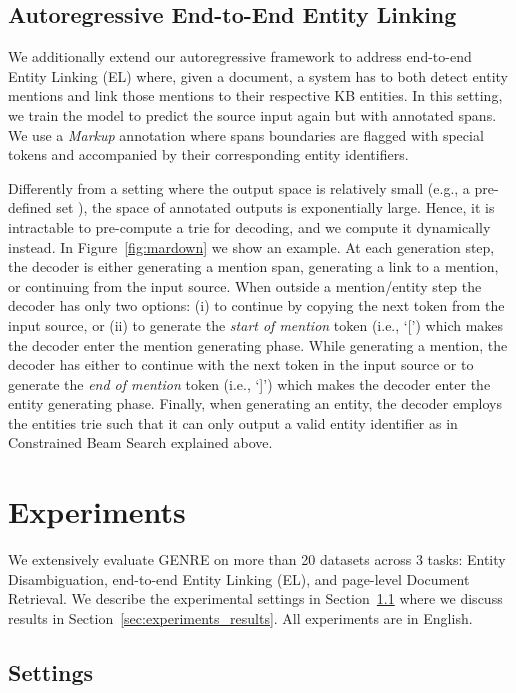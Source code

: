\documentclass{article} \usepackage{main,times}
\makeatletter
\def\genre{\textsc{GENRE}\@\xspace}
\makeatother
\begin{document}
\subsection{Autoregressive End-to-End Entity Linking}

We additionally extend our autoregressive framework to address end-to-end Entity Linking (EL) where, given a document, a system has to both detect entity mentions and link those mentions to their respective KB entities. In this setting, we train the model to predict the source input again but with annotated spans. We use a \textit{Markup} annotation where spans boundaries are flagged with special tokens and accompanied by their corresponding entity identifiers.

Differently from a setting where the output space is relatively small (e.g., a pre-defined set ), the space of annotated outputs is exponentially large. Hence, it is intractable to pre-compute a trie for decoding, and we compute it dynamically instead. In Figure~\ref{fig:mardown} we show an example. At each generation step, the decoder is either generating a mention span, generating a link to a mention, or continuing from the input source.
When outside a mention/entity step the decoder has only two options: (i) to continue by copying the next token from the input source, or (ii) to generate the \textit{start of mention} token (i.e., `[') which makes the decoder enter the mention generating phase. While generating a mention, the decoder has either to continue with the next token in the input source or to generate the \textit{end of mention} token (i.e., `]') which makes the decoder enter the entity generating phase.
Finally, when generating an entity, the decoder employs the entities trie
such that it can only output a valid entity identifier as in Constrained Beam Search explained above.


 \section{Experiments} \label{sec:experiments}



We extensively evaluate \genre on more than 20 datasets across 3 tasks: Entity Disambiguation, end-to-end Entity Linking (EL), and page-level Document Retrieval. We describe the experimental settings in Section~\ref{sec:experiments_settings} where we discuss results in Section~\ref{sec:experiments_results}. All experiments are in English.

\subsection{Settings} \label{sec:experiments_settings}
\end{document}

